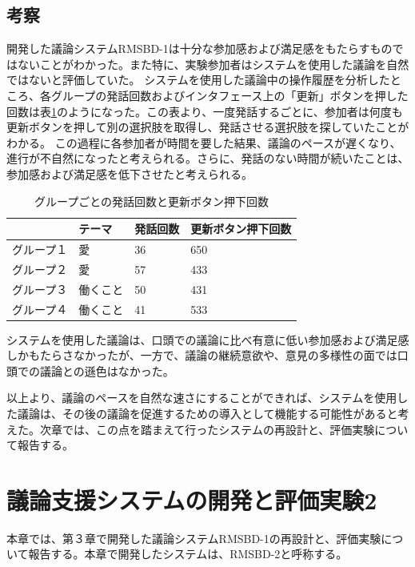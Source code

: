 \documentclass[11pt, a4paper]{jreport} %
\begin{document}
\section{考察}
開発した議論システムRMSBD-1は十分な参加感および満足感をもたらすものではないことがわかった。また特に、実験参加者はシステムを使用した議論を自然ではないと評価していた。
システムを使用した議論中の操作履歴を分析したところ、各グループの発話回数およびインタフェース上の「更新」ボタンを押した回数は表\ref{tab:jikken1_log}のようになった。この表より、一度発話するごとに、参加者は何度も更新ボタンを押して別の選択肢を取得し、発話させる選択肢を探していたことがわかる。
この過程に各参加者が時間を要した結果、議論のペースが遅くなり、進行が不自然になったと考えられる。さらに、発話のない時間が続いたことは、参加感および満足感を低下させたと考えられる。

\begin{table}[]
\centering
\caption{グループごとの発話回数と更新ボタン押下回数}
\label{tab:jikken1_log}
\begin{tabular}{@{}llll@{}}
\toprule
\multicolumn{1}{c}{} & テーマ  & 発話回数 & 更新ボタン押下回数 \\ \midrule
グループ１                & 愛    & 36   & 650       \\
グループ２                & 愛    & 57   & 433       \\
グループ３                & 働くこと & 50   & 431       \\
グループ４                & 働くこと & 41   & 533       \\ \bottomrule
\end{tabular}
\end{table}


システムを使用した議論は、口頭での議論に比べ有意に低い参加感および満足感しかもたらさなかったが、一方で、議論の継続意欲や、意見の多様性の面では口頭での議論との遜色はなかった。


以上より、議論のペースを自然な速さにすることができれば、システムを使用した議論は、その後の議論を促進するための導入として機能する可能性があると考えた。次章では、この点を踏まえて行ったシステムの再設計と、評価実験について報告する。





\chapter{議論支援システムの開発と評価実験2}
本章では、第３章で開発した議論システムRMSBD-1の再設計と、評価実験について報告する。本章で開発したシステムは、RMSBD-2と呼称する。
\end{document}
